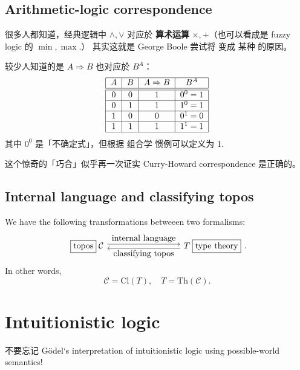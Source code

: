 \subsection{Arithmetic-logic correspondence}

很多人都知道，经典逻辑中 $\wedge, \vee$ 对应於 \textbf{算术运算} $\times, +$（也可以看成是 fuzzy logic 的 $\min, \max$.） 其实这就是 George Boole 尝试将  变成 某种 的原因。

较少人知道的是 $A \Rightarrow B$ 也对应於 $B^A$：
\begin{equation}
\begin{tabular}{|c|c|c|c|}
	\hline 
	$A$ & $B$ & $A \Rightarrow B$ & $B^A$ \\ 
	\hline \hline 
	0 & 0 & 1 & $0^0 = 1$ \\
	\hline 
	0 & 1 & 1 & $1^0 = 1$ \\ 
	\hline 
	1 & 0 & 0 & $0^1 = 0$ \\ 
	\hline 
	1 & 1 & 1 & $1^1 = 1$ \\ 
	\hline 
\end{tabular} 
\end{equation}
其中 $0^0$ 是「不确定式」，但根据 组合学 惯例可以定义为 1.

这个惊奇的「巧合」似乎再一次证实 Curry-Howard correspondence 是正确的。 


\subsection{Internal language and classifying topos}

We have the following transformations betweeen two formalisms:
\begin{equation}
\begin{tikzcd}[column sep = 20ex]
\boxed{\mbox{topos}} \; \mathcal{C}
\arrow[r, shift left, "\mbox{internal language}"]
& T \; \boxed{\mbox{type theory}}
\arrow[l, shift left, "\mbox{classifying topos}"]
\end{tikzcd}.
\end{equation}
In other words,
\begin{equation}
\mathcal{C} = \mathrm{Cl}(T), \quad T = \mathrm{Th}(\mathcal{C}).
\end{equation}

\section{Intuitionistic logic}

不要忘记 G\"{o}del`s interpretation of intuitionistic logic using possible-world semantics!

